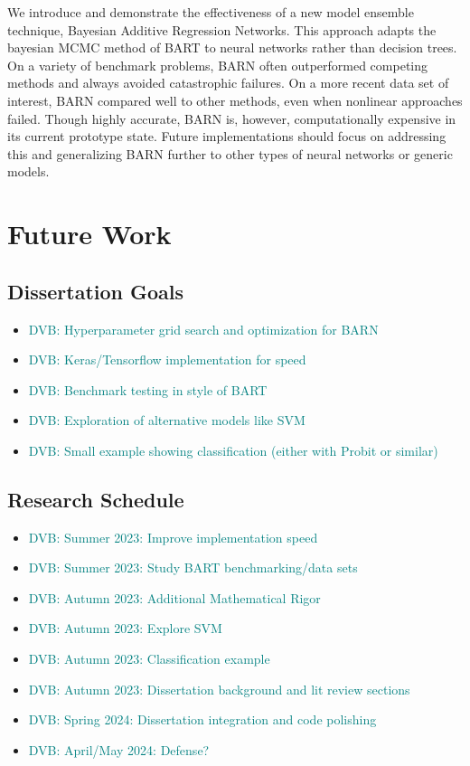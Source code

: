 \documentclass[12pt]{article}
\newcommand{\dvb}[1]{\textcolor{teal}{DVB: #1}}  %
\begin{document}
We introduce and demonstrate the effectiveness of a new model ensemble technique, Bayesian Additive Regression Networks.  This approach adapts the bayesian MCMC method of BART to neural networks rather than decision trees.  On a variety of benchmark problems, BARN often outperformed competing methods and always avoided catastrophic failures.  On a more recent data set of interest, BARN compared well to other methods, even when nonlinear approaches failed.  Though highly accurate, BARN is, however, computationally expensive in its current prototype state.  Future implementations should focus on addressing this and generalizing BARN further to other types of neural networks or generic models.

\section{Future Work}

\subsection{Dissertation Goals}

\begin{itemize}
\item \dvb{Hyperparameter grid search and optimization for BARN}
\item \dvb{Keras/Tensorflow implementation for speed}
\item \dvb{Benchmark testing in style of BART}
\item \dvb{Exploration of alternative models like SVM}
\item \dvb{Small example showing classification (either with Probit or similar)}
\end{itemize}

\subsection{Research Schedule}

\begin{itemize}
\item \dvb{Summer 2023: Improve implementation speed}
\item \dvb{Summer 2023: Study BART benchmarking/data sets}
\item \dvb{Autumn 2023: Additional Mathematical Rigor}
\item \dvb{Autumn 2023: Explore SVM}
\item \dvb{Autumn 2023: Classification example}
\item \dvb{Autumn 2023: Dissertation background and lit review sections}
\item \dvb{Spring 2024: Dissertation integration and code polishing}
\item \dvb{April/May 2024: Defense?}
\end{itemize}
\end{document}
